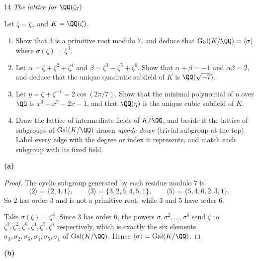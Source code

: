 \documentclass[11pt]{article}
\begin{document}
\begin{problem}{14}
  \textit{The lattice for $\QQ(\zeta_7)$}\par
  Let $\zeta=\zeta_7$ and $K=\QQ(\zeta)$.
  \begin{enumerate}[label=(\alph*)]
    \item Show that $3$ is a primitive root modulo $7$, and deduce that $\operatorname{Gal}(K/\QQ)=\langle\sigma\rangle$ where $\sigma(\zeta)=\zeta^3$.
    \item Let $\alpha=\zeta+\zeta^2+\zeta^4$ and $\beta=\zeta^3+\zeta^5+\zeta^6$. Show that $\alpha+\beta=-1$ and $\alpha\beta=2$, and deduce that the unique quadratic subfield of $K$ is $\QQ(\sqrt{-7})$.
    \item Let $\eta=\zeta+\zeta^{-1}=2\cos(2\pi/7)$. Show that the minimal polynomial of $\eta$ over $\QQ$ is $x^3+x^2-2x-1$, and that $\QQ(\eta)$ is the unique cubic subfield of $K$.
    \item Draw the lattice of intermediate fields of $K/\QQ$, and beside it the lattice of subgroups of $\operatorname{Gal}(K/\QQ)$ drawn \emph{upside down} (trivial subgroup at the top). Label every edge with the degree or index it represents, and match each subgroup with its fixed field.
  \end{enumerate}
\end{problem}
\noindent\textbf{(a)}
\begin{proof}
The cyclic subgroup generated by each residue modulo $7$ is
\[
\langle 2\rangle=\{2,4,1\},\qquad \langle 3\rangle=\{3,2,6,4,5,1\},\qquad \langle 5\rangle=\{5,4,6,2,3,1\}.
\]
So $2$ has order $3$ and is not a primitive root, while $3$ and $5$ have order $6$.

Take $\sigma(\zeta)=\zeta^{3}$. Since $3$ has order $6$, the powers $\sigma,\sigma^{2},\dots,\sigma^{6}$ send $\zeta$ to $\zeta^{3},\zeta^{2},\zeta^{6},\zeta^{4},\zeta^{5},\zeta^{1}$ respectively, which is exactly the six elements $\sigma_{3},\sigma_{2},\sigma_{6},\sigma_{4},\sigma_{5},\sigma_{1}$ of $\operatorname{Gal}(K/\QQ)$. Hence $\langle\sigma\rangle=\operatorname{Gal}(K/\QQ)$.
\end{proof}
\noindent\textbf{(b)}
\end{document}
